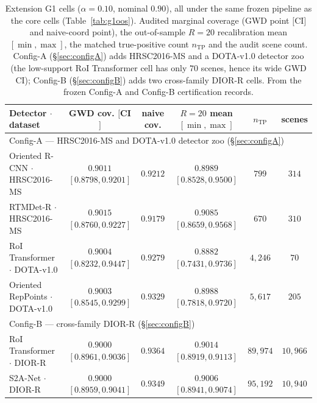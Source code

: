 \documentclass[journal]{IEEEtran}
\begin{document}
\begin{table}[!t]\centering\small
\caption{Extension G1 cells ($\alpha=0.10$, nominal $0.90$), all under the same frozen pipeline as the core
cells (Table~\ref{tab:g1oos}). Audited marginal coverage (GWD point $[$CI$]$ and naive-coord point), the
out-of-sample $R{=}20$ recalibration mean $[\min,\max]$, the matched true-positive count $n_{\mathrm{TP}}$
and the audit scene count. Config-A (\S\ref{sec:configA}) adds HRSC2016-MS and a DOTA-v1.0 detector zoo (the
low-support RoI Transformer cell has only $70$ scenes, hence its wide GWD CI); Config-B (\S\ref{sec:configB})
adds two cross-family DIOR-R cells. From the frozen Config-A and Config-B certification
records.}\label{tab:extcells}
\begin{tabular}{lccccc}
\toprule
Detector $\cdot$ dataset & GWD cov. $[$CI$]$ & naive cov. & $R{=}20$ mean $[\min,\max]$ & $n_{\mathrm{TP}}$ & scenes \\
\midrule
\multicolumn{6}{l}{Config-A --- HRSC2016-MS and DOTA-v1.0 detector zoo (\S\ref{sec:configA})} \\
Oriented R-CNN $\cdot$ HRSC2016-MS   & $0.9011$ $[0.8798,0.9201]$ & $0.9212$ & $0.8989$ $[0.8528,0.9500]$ & $799$      & $314$ \\
RTMDet-R $\cdot$ HRSC2016-MS         & $0.9015$ $[0.8760,0.9227]$ & $0.9179$ & $0.9085$ $[0.8659,0.9568]$ & $670$      & $310$ \\
RoI Transformer $\cdot$ DOTA-v1.0    & $0.9004$ $[0.8232,0.9447]$ & $0.9279$ & $0.8882$ $[0.7431,0.9736]$ & $4{,}246$  & $70$  \\
Oriented RepPoints $\cdot$ DOTA-v1.0 & $0.9003$ $[0.8545,0.9299]$ & $0.9329$ & $0.8988$ $[0.7818,0.9720]$ & $5{,}617$  & $205$ \\
\midrule
\multicolumn{6}{l}{Config-B --- cross-family DIOR-R (\S\ref{sec:configB})} \\
RoI Transformer $\cdot$ DIOR-R & $0.9000$ $[0.8961,0.9036]$ & $0.9364$ & $0.9014$ $[0.8919,0.9113]$ & $89{,}974$ & $10{,}966$ \\
S2A-Net $\cdot$ DIOR-R         & $0.9000$ $[0.8959,0.9041]$ & $0.9349$ & $0.9006$ $[0.8941,0.9074]$ & $95{,}192$ & $10{,}940$ \\
\bottomrule
\end{tabular}
\end{table}
\end{document}
